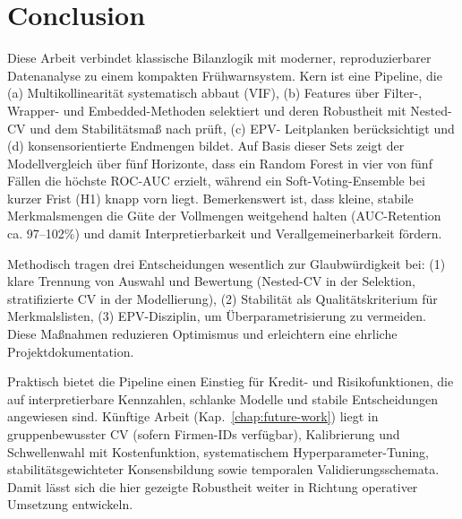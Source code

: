 \chapter{Conclusion}

Diese Arbeit verbindet klassische Bilanzlogik mit moderner, reproduzierbarer
Datenanalyse zu einem kompakten Frühwarnsystem. Kern ist eine Pipeline, die
(a) Multikollinearität systematisch abbaut (VIF), (b) Features über Filter-,
Wrapper- und Embedded-Methoden selektiert und deren Robustheit mit Nested-CV
und dem Stabilitätsmaß nach \textcite{nogueira2018stability} prüft, (c) EPV-
Leitplanken berücksichtigt und (d) konsensorientierte Endmengen bildet. Auf
Basis dieser Sets zeigt der Modellvergleich über fünf Horizonte, dass ein
Random Forest in vier von fünf Fällen die höchste ROC-AUC erzielt, während ein
Soft-Voting-Ensemble bei kurzer Frist (H1) knapp vorn liegt. Bemerkenswert ist,
dass kleine, stabile Merkmalsmengen die Güte der Vollmengen weitgehend halten
(AUC-Retention ca. 97--102\%) und damit Interpretierbarkeit und
Verallgemeinerbarkeit fördern.

Methodisch tragen drei Entscheidungen wesentlich zur Glaubwürdigkeit bei:
(1) klare Trennung von Auswahl und Bewertung (Nested-CV in der Selektion,
stratifizierte CV in der Modellierung), (2) Stabilität als Qualitätskriterium
für Merkmalslisten, (3) EPV-Disziplin, um Überparametrisierung zu vermeiden.
Diese Maßnahmen reduzieren Optimismus und erleichtern eine ehrliche
Projektdokumentation.

Praktisch bietet die Pipeline einen Einstieg für Kredit- und
Risikofunktionen, die auf interpretierbare Kennzahlen, schlanke Modelle und
stabile Entscheidungen angewiesen sind. Künftige Arbeit (Kap.~\ref{chap:future-work})
liegt in gruppenbewusster CV (sofern Firmen-IDs verfügbar),
Kalibrierung und Schwellenwahl mit Kostenfunktion, systematischem
Hyperparameter-Tuning, stabilitätsgewichteter Konsensbildung sowie temporalen
Validierungsschemata. Damit lässt sich die hier gezeigte Robustheit weiter in
Richtung operativer Umsetzung entwickeln.
